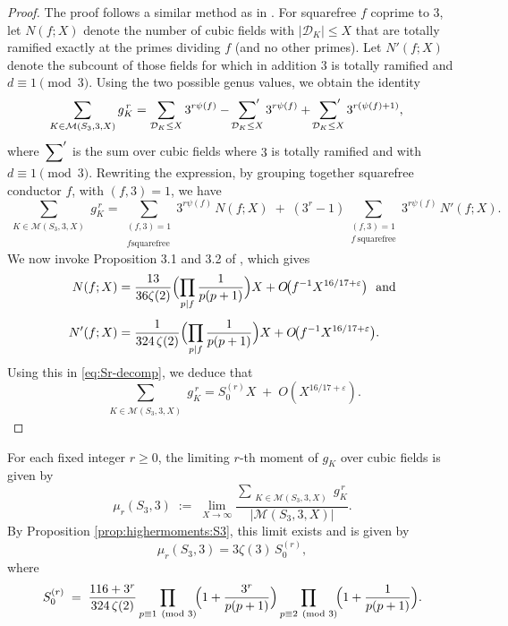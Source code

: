 \documentclass[11pt,reqno]{amsart}
\newcommand{\cD}{\mathcal{D}}
\newcommand{\cM}{\mathcal{M}}
\theoremstyle{definition}
\theoremstyle{remark}
\begin{document}
\begin{proof}
    The proof follows a similar method as in \cite[section 4] {cubicwithgenusnumber1}. For squarefree $f$ coprime to $3$, let $N(f; X)$ denote the number of cubic fields with $|\cD_K|\le X$ that are totally ramified exactly at the primes dividing $f$ (and no other primes). Let $N'(f;X )$ denote the subcount of those fields for which in addition $3$ is totally ramified and $d\equiv1\pmod3$. 
		Using the two possible genus values, we obtain the identity
		\begin{align}\label{eq:Sr-decomp}
		\sum_{\substack{K\in \cM(S_3, 3, X)}}  g_K^{\,r}
	&	=  \sum_{\cD_K\leq X} 3^{r\psi(f)}
		- \sideset{}{'}\sum_{\cD_K\leq X} 3^{r\psi(f)}
		+ \sideset{}{'}\sum_{\cD_K\leq X} 3^{r(\psi(f)+1)},
	\end{align}
	where $\sideset{}{'}\sum$ is the sum over  cubic fields where $3$ is totally ramified and with $d\equiv 1 \pmod{3}$. Rewriting the expression, by grouping together squarefree conductor $f$, with $(f,3)=1$, we have
    \[
        \sum_{\substack{K\in \cM(S_3, 3, X)}} g_K^{\,r}
        = \sum_{\substack{(f,3)=1\\ \\ f \text{squarefree} }} 3^{r\psi(f)}\, N(f;X)
\;+\;
(3^{r}-1) \sum_{\substack{(f,3)=1\\ f ~\text{squarefree}}} 3^{r\psi(f)}\, N'(f;X).
\]
We now invoke Proposition 3.1 and 3.2 of \cite{cubicwithgenusnumber1}, which gives
\begin{align*}
		N(f;X)
		&= \frac{13}{36\zeta(2)}
		\Bigl(\prod_{p\mid f}\frac{1}{p(p+1)}\Bigr)X
		+ O\!\bigl(f^{-1}X^{16/17+\varepsilon}\bigr) \,\,\text{ and}\\[4pt]
		N'(f;X)
		&= \frac{1}{324\,\zeta(2)}
		\Bigl(\prod_{p\mid f}\frac{1}{p(p+1)}\Bigr)X
		+ O\!\bigl(f^{-1}X^{16/17+\varepsilon}\bigr). 
	\end{align*}
    Using this in \eqref{eq:Sr-decomp}, we deduce that
    \[
\sum_{\substack{K\in \cM(S_3, 3, X)}} g_K^{\,r}
= S_0^{(r)}X
\;+\; O(X^{16/17 + \varepsilon}).
\]
    
\end{proof}
\smallskip

For each fixed integer $r \ge 0$, the limiting $r$-th moment of $g_K$ over cubic fields is given by
\[
\mu_r(S_3,3) \;:=\; \lim_{X\to\infty}
\frac{\displaystyle \sum_{\substack{K\in \cM(S_3, 3, X)}} g_K^{\,r}}
     {\displaystyle |\cM(S_3, 3, X)|}.
\]
By Proposition \ref{prop:highermoments:S3}, this limit exists and is given by
\[
\mu_r(S_3,3) = 3\zeta(3)\,S_0^{(r)},
\]
where
\[
S_0^{(r)} \;=\; \frac{116+3^{r}}{324\,\zeta(2)}
\prod_{p\equiv1\pmod3}\!\Bigl(1+\frac{3^{r}}{p(p+1)}\Bigr)
\prod_{p\equiv2\pmod3}\!\Bigl(1+\frac{1}{p(p+1)}\Bigr).
\]
\smallskip
\end{document}
